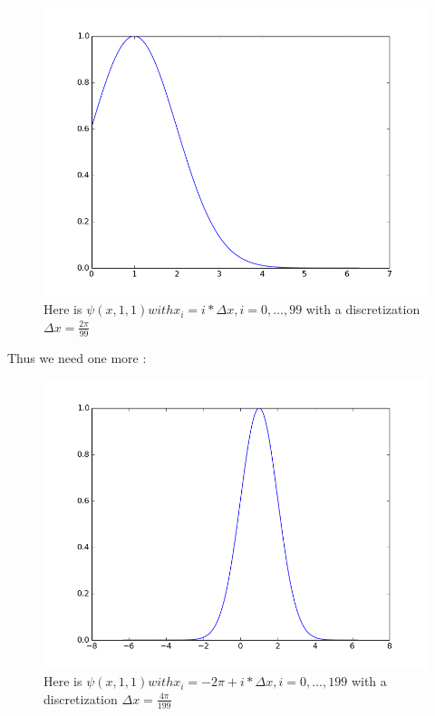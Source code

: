 \documentclass[a4paper]{report}
\begin{document}
\begin{figure}[H]
\begin{center}
\includegraphics[scale=0.31]{f_x_1_1_1.png}\caption{Here is $\psi(x,1,1) with x_i=i*\Delta x,i=0,...,99$ with a discretization $\Delta x=\frac{2\pi}{99}$}
\end{center}
\end{figure}
Thus we need one more :
\begin{figure}[H]
\begin{center}
\includegraphics[scale=0.31]{f_x_1_1_1_whole.png}\caption{Here is $\psi(x,1,1) with x_i=-2\pi+i*\Delta x,i=0,...,199$ with a discretization $\Delta x=\frac{4\pi}{199}$}
\end{center}
\end{figure}
\end{document}
